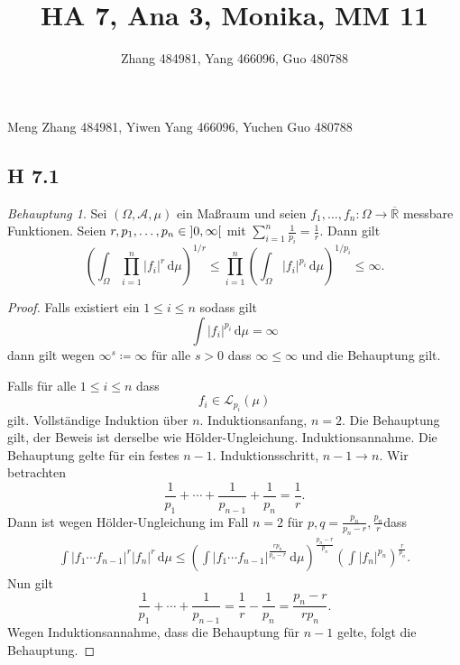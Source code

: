\documentclass[draft,a5paper]{article}
\title{HA 7, Ana 3, Monika, MM 11}
\author{Zhang 484981, Yang 466096, Guo 480788}
\providecommand{\abs}[1]{\left\lvert#1\right\rvert}
\theoremstyle{remark}
\newtheorem*{Behauptung}{Behauptung}
\newcommand{\dd}{\,\mathrm{d}}
\begin{document}
\maketitle
\begin{center}
  Meng Zhang 484981, Yiwen Yang 466096, Yuchen Guo 480788
\end{center}

\subsection{H 7.1}
\begin{Behauptung}
  Sei \((\Omega, \mathcal{A}, \mu)\) ein Maßraum und seien \(f_{1}, \ldots, f_{n}\colon \Omega \to
  \overline{\mathbb{R}}\) messbare Funktionen.  Seien \(r, p_{1}, \ldots, p_{n} \in
  \ointerval{0}{\infty}\) mit \(\sum_{i=1}^{n}{\frac{1}{p_{i}}} = \frac{1}{r}\).
  Dann gilt
  \[\left(\int_{\Omega}\prod_{i=1}^{n}{\abs{f_{i}}^{r}\dd\mu}\right)^{1/r} \le
    \prod_{i=1}^{n}\left(\int_{\Omega}\abs{f_{i}}^{p_{i}}\dd\mu\right)^{1/p_{i}}\le\infty.\]
\end{Behauptung}
\begin{proof}
  Falls existiert ein \(1 \le i \le n\) sodass gilt
  \[\int\abs{f_{i}}^{p_{i}}\dd\mu = \infty\]
  dann gilt wegen \(\infty^{s} \coloneq \infty\) für alle \(s >0\) dass
  \(\infty \le \infty\) und die Behauptung gilt.

  Falls für alle \(1\le i \le n\) dass
  \[f_{i} \in \mathcal{L}_{p_{i}}(\mu)\] gilt.  Vollständige Induktion über
  \(n\).  Induktionsanfang, \(n = 2\).  Die Behauptung gilt, der Beweis
  ist derselbe wie Hölder-Ungleichung.  Induktionsannahme. Die
  Behauptung gelte für ein festes \(n-1\).  Induktionsschritt,
  \(n -1 \to n\).  Wir betrachten
  \[\frac{1}{p_{1}}+\cdots+\frac{1}{p_{n-1}} + \frac{1}{p_{n}}
    = \frac{1}{r}.\]
  Dann ist wegen Hölder-Ungleichung im Fall \(n = 2\) für \(p, q =
  \frac{p_{n}}{p_{n}-r}, \frac{p_{n}}{r}\)dass
  \begin{align*}
    \int\abs{f_{1} \cdots f_{n-1}}^{r}\abs{f_{n}}^{r}\dd\mu \le
    \left(\int\abs{f_{1}\cdots f_{n-1}}^{\frac{rp_{n}}{p_{n}-r}}\dd\mu\right)^{\frac{p_{n}-r}{p_{n}}}\left(\int\abs{f_{n}}^{p_{n}}\right)^{\frac{r}{p_{n}}}.
  \end{align*}
  Nun gilt
  \[\frac{1}{p_{1}}+\cdots+\frac{1}{p_{n-1}}=\frac{1}{r} -
    \frac{1}{p_{n}}  = \frac{p_{n}-r}{rp_{n}}.\]
  Wegen Induktionsannahme, dass die Behauptung für \(n-1\) gelte, folgt
  die Behauptung.
\end{proof}
\end{document}
